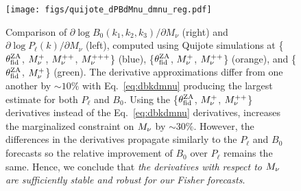 \begin{figure}
\begin{center}
    \texttt{[image: figs/quijote\_dPBdMnu\_dmnu\_reg.pdf]} 
    \caption{Comparison of $\partial \log B_0(k_1, k_2, k_3)/\partial M_\nu$ (right) 
    and $\partial \log P_\ell(k)/\partial M_\nu$ (left), computed using Quijote simulations 
    at \{$\theta_{\rm fid}^{\rm ZA}$, $M_\nu^{+}$, $M_\nu^{++}$, $M_\nu^{+++}$\} (blue), 
    \{$\theta_{\rm fid}^{\rm ZA}$, $M_\nu^{+}$, $M_\nu^{++}$\} (orange), and \{$\theta_{\rm fid}^{\rm ZA}$, $M_\nu^{+}$\} 
    (green). The derivative approximations differ from one another by $\sim10\%$ with 
    Eq.~\ref{eq:dbkdmnu} producing the largest estimate for both $P_\ell$ and $B_0$.
    Using the \{$\theta_{\rm fid}^{\rm ZA}$, $M_\nu^{+}$, $M_\nu^{++}$\} derivatives instead of the 
    Eq.~\ref{eq:dbkdmnu} derivatives, increases the marginalized constraint on $M_\nu$ 
    by $\sim 30\%$. However, the differences in the derivatives propagate similarly to 
    the $P_\ell$ and $B_0$ forecasts so the relative improvement of $B_0$ over $P_\ell$
    remains the same. Hence, we conclude that {\em the derivatives with respect to $M_\nu$ 
    are sufficiently stable and robust for our Fisher forecasts}.
    }
\label{fig:dPBdmnu}
\end{center}
\end{figure}
